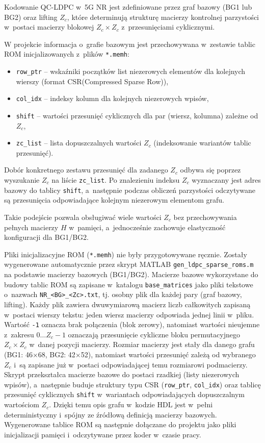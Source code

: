 Kodowanie QC-LDPC w~5G NR jest zdefiniowane przez graf bazowy (BG1 lub BG2) oraz lifting $Z_c$, które determinują strukturę macierzy kontrolnej parzystości w~postaci macierzy blokowej $Z_c \times Z_c$ z~przesunięciami cyklicznymi.

W projekcie informacja o~grafie bazowym jest przechowywana w~zestawie tablic ROM inicjalizowanych z~plików \texttt{*.memh}:
\begin{itemize}
    \item \texttt{row\_ptr} -- wskaźniki początków list niezerowych elementów dla kolejnych wierszy (format CSR(Compressed Sparse Row)),
    \item \texttt{col\_idx} -- indeksy kolumn dla kolejnych niezerowych wpisów,
    \item \texttt{shift} -- wartości przesunięć cyklicznych dla par (wiersz, kolumna) zależne od $Z_c$,
    \item \texttt{zc\_list} -- lista dopuszczalnych wartości $Z_c$ (indeksowanie wariantów tablic przesunięć).
\end{itemize}

Dobór konkretnego zestawu przesunięć dla zadanego $Z_c$ odbywa się poprzez wyszukanie $Z_c$ na liście \texttt{zc\_list}. Po znalezieniu indeksu $Z_c$ wyznaczany jest adres bazowy do tablicy \texttt{shift}, a~następnie podczas obliczeń parzystości odczytywane są przesunięcia odpowiadające kolejnym niezerowym elementom grafu.

Takie podejście pozwala obsługiwać wiele wartości $Z_c$ bez przechowywania pełnych macierzy $H$ w~pamięci, a~jednocześnie zachowuje elastyczność konfiguracji dla BG1/BG2.

Pliki inicjalizacyjne ROM (\texttt{*.memh}) nie były przygotowywane ręcznie. Zostały wygenerowane automatycznie przez skrypt MATLAB \texttt{gen\_ldpc\_sparse\_roms.m} na podstawie macierzy bazowych (BG1/BG2). Macierze bazowe wykorzystane do budowy tablic ROM są zapisane w~katalogu \texttt{base\_matrices} jako pliki tekstowe o~nazwach \texttt{NR\_<BG>\_<Zc>.txt}, tj. osobny plik dla każdej pary (graf bazowy, lifting). Każdy plik zawiera dwuwymiarową macierz liczb całkowitych zapisaną w~postaci wierszy tekstu: jeden wiersz macierzy odpowiada jednej linii w~pliku. Wartość \texttt{-1} oznacza brak połączenia (blok zerowy), natomiast wartości nieujemne z~zakresu $0 \ldots Z_c-1$ oznaczają przesunięcie cykliczne bloku permutacyjnego $Z_c \times Z_c$ w~danej pozycji macierzy. Rozmiar macierzy jest stały dla danego grafu (BG1: 46$\times$68, BG2: 42$\times$52), natomiast wartości przesunięć zależą od wybranego $Z_c$ i~są zapisane już w~postaci odpowiadającej temu rozmiarowi podmacierzy.
 Skrypt przekształca macierze bazowe do postaci rzadkiej (listy niezerowych wpisów), a~następnie buduje struktury typu CSR (\texttt{row\_ptr}, \texttt{col\_idx}) oraz tablicę przesunięć cyklicznych \texttt{shift} w~wariantach odpowiadających dopuszczalnym wartościom $Z_c$. Dzięki temu opis grafu w~kodzie HDL jest w~pełni deterministyczny i~spójny ze źródłową definicją macierzy bazowych. Wygenerowane tablice ROM są następnie dołączane do projektu jako pliki inicjalizacji pamięci i~odczytywane przez koder w~czasie pracy.


